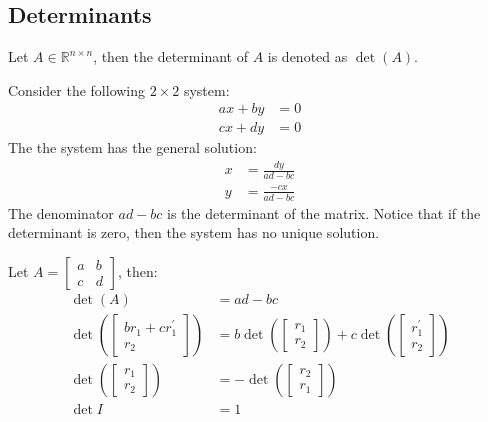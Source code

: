 \documentclass[11pt]{report}
\begin{document}
\subsection{Determinants}
\begin{definition}[Determinant]
    Let $A \in \mathbb{R}^{n \times n}$, then the determinant of $A$ is denoted as $\det(A)$.
\end{definition}
\begin{example}
    Consider the following $2\times 2$ system:
    \begin{align*}
        ax + by &= 0 \\
        cx + dy &= 0
    \end{align*}
    The the system has the general solution:
    \begin{align*}
        x &= \frac{dy}{ad - bc} \\
        y &= \frac{-cx}{ad - bc}
    \end{align*}
    The denominator $ad - bc$ is the determinant of the matrix. Notice that if the determinant is zero, then the system has no unique solution.
\end{example}
\begin{theorem}
    Let $A = \begin{bmatrix} a & b \\ c & d \end{bmatrix}$, then:
    \begin{align}
        \det(A) &= ad - bc \\
        \det\left(\begin{bmatrix}
            br_1 + cr_1^\prime \\ r_2
        \end{bmatrix}\right) &= b\det\left(\begin{bmatrix}
            r_1 \\ r_2
        \end{bmatrix}\right) + c\det\left(\begin{bmatrix}
            r_1^\prime \\ r_2 
        \end{bmatrix}\right) \\
        \det\left(\begin{bmatrix}
            r_1 \\ r_2
        \end{bmatrix}\right) &= -\det\left(\begin{bmatrix}
            r_2 \\ r_1
        \end{bmatrix}\right) \\ 
        \det I &= 1
\end{align}
\end{theorem}
\end{document}
